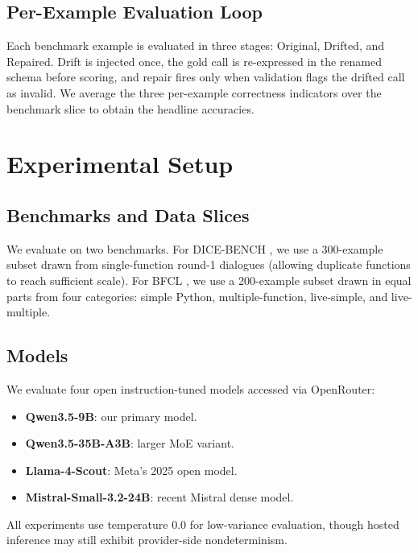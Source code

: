 \documentclass[runningheads]{llncs}
\begin{document}
\subsection{Per-Example Evaluation Loop}
\label{subsec:eval-loop}

Each benchmark example is evaluated in three stages: Original, Drifted, and
Repaired. Drift is injected once, the gold call is re-expressed in the renamed
schema before scoring, and repair fires only when validation flags the drifted
call as invalid. We average the three per-example correctness indicators over
the benchmark slice to obtain the headline accuracies.

\section{Experimental Setup}
\subsection{Benchmarks and Data Slices}
We evaluate on two benchmarks. For DICE-BENCH \cite{jang2025dicebench}, we use a
300-example subset drawn from single-function round-1 dialogues (allowing duplicate
functions to reach sufficient scale). For BFCL \cite{bfcl2024}, we use a 200-example
subset drawn in equal parts from four categories: simple Python, multiple-function,
live-simple, and live-multiple.

\subsection{Models}
We evaluate four open instruction-tuned models accessed via OpenRouter:

\begin{itemize}
\item \textbf{Qwen3.5-9B}: our primary model.
\item \textbf{Qwen3.5-35B-A3B}: larger MoE variant.
\item \textbf{Llama-4-Scout}: Meta's 2025 open model.
\item \textbf{Mistral-Small-3.2-24B}: recent Mistral dense model.
\end{itemize}

All experiments use temperature $0.0$ for low-variance evaluation, though hosted
inference may still exhibit provider-side nondeterminism.
\end{document}
